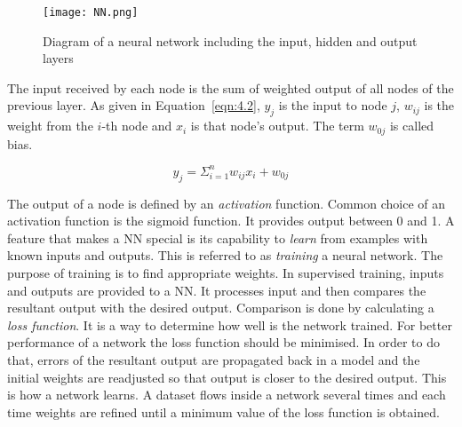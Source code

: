\begin{figure}[htbp]
  \centering
    \texttt{[image: NN.png]}
  \caption[Neural Network]{Diagram of a neural network including the input, hidden and output 
  layers~\cite{NN}}
  \label{fig:NN}
\end{figure}

The input received by each node is the sum of weighted output of all nodes of the previous layer. 
As given in Equation~\ref{eqn:4.2}, $y_j$ is the input to node $j$, $w_{ij}$ is the weight from the 
$i$-th node and $x_i$ is that node's output. The term $w_{0j}$ is called bias. 

\begin{equation}
    y_j = \Sigma_{i=1}^{n} w_{ij}x_i + w_{0j} 
    \label{eqn:4.2}
\end{equation}


The output of a node is defined by an \textit{activation} function. Common choice of an activation 
function is the sigmoid function. It provides output between 0 and 1. A feature that makes a NN special
is its capability to \textit{learn} from examples with known inputs and outputs. This is referred to 
as \textit{training} a neural network. The purpose of training is to find appropriate weights. 
In supervised training, inputs and outputs are provided to a NN. It processes input and then compares 
the resultant output with the desired output. Comparison is done by calculating 
a \textit{loss function}. It is a way to determine how well is the network trained. For better
performance of a network the loss function should be minimised. In order to do that, errors of the 
resultant output are propagated back in a model and the initial weights are readjusted so that 
output is closer to the desired output. This is how a network learns. A dataset flows inside a 
network several times and each time weights are refined until a minimum value of the loss function 
is obtained.

